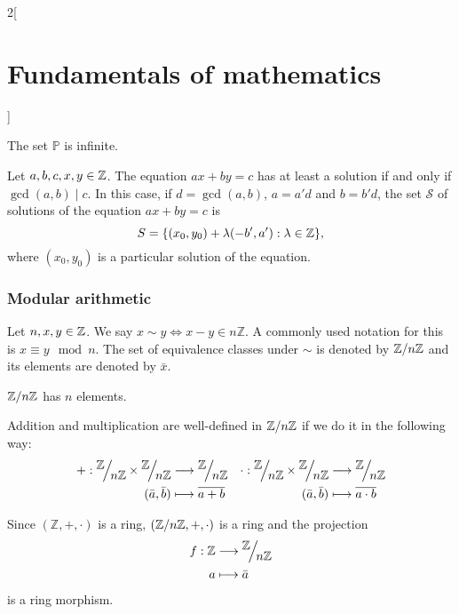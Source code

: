 \documentclass[../../../main.tex]{subfiles}
\begin{document}
\begin{multicols}{2}[\section{Fundamentals of mathematics}]
\begin{theorem}
  \end{theorem}
  \begin{theorem}
    The set $\mathbb{P}$ is infinite.
  \end{theorem}
  \begin{theorem}
    Let $a,b,c,x,y\in\mathbb{Z}$. The equation $ax+by=c$ has at least a solution if and only if $\gcd(a,b)\mid c$. In this case, if $d=\gcd(a,b)$, $a=a'd$ and $b=b'd$, the set $\mathcal{S}$ of solutions of the equation $ax+by=c$ is $$S=\{(x_0,y_0)+\lambda(-b',a'):\lambda\in\mathbb{Z}\},$$ where $(x_0,y_0)$ is a particular solution of the equation.
  \end{theorem}
  \subsubsection{Modular arithmetic}
  \begin{definition}
    Let $n,x,y\in\mathbb{Z}$. We say $x\sim y\iff x-y\in n\mathbb{Z}$. A commonly used notation for this is $x\equiv y\mod n$. The set of equivalence classes under $\sim$ is denoted by $\quot{\mathbb{Z}}{n\mathbb{Z}}$ and its elements are denoted by $\bar{x}$.
  \end{definition}
  \begin{lemma}
    $\quot{\ZZ}{n\ZZ}$ has $n$ elements.
  \end{lemma}
  \begin{prop}
    Addition and multiplication are well-defined in $\quot{\ZZ}{n\ZZ}$ if we do it in the following way:
    \begin{align*}
      +:\quot{\ZZ}{n\ZZ}\times\quot{\ZZ}{n\ZZ} & \longrightarrow\quot{\ZZ}{n\ZZ} & \cdot:\quot{\ZZ}{n\ZZ}\times\quot{\ZZ}{n\ZZ} & \longrightarrow\quot{\ZZ}{n\ZZ} \\
      (\bar{a},\bar{b})                        & \longmapsto\overline{a+b}       & (\bar{a},\bar{b})                            & \longmapsto\overline{a\cdot b}
    \end{align*}
  \end{prop}
  \begin{theorem}
    Since $(\mathbb{Z},+,\cdot)$ is a ring, $(\quot{\ZZ}{n\ZZ},+,\cdot)$ is a ring and the projection
    \begin{align*}
      f:\mathbb{Z} & \longrightarrow\quot{\ZZ}{n\ZZ} \\
      a            & \longmapsto\bar{a}
    \end{align*}
    is a ring morphism.
  \end{theorem}
  \begin{lemma}

\end{lemma}
\end{multicols}
\end{document}
